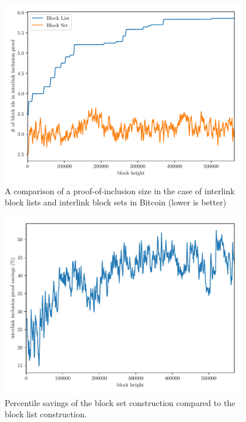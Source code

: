 \begin{figure}[h]
\begin{center}
  \includegraphics[width=0.95\textwidth]{figures/interlink-proof-list-vs-set.pdf}
  \caption{A comparison of a proof-of-inclusion size in the case of interlink block lists and interlink block sets in Bitcoin (lower is better)}
  \label{fig.set-list-proof-comparison}
  \end{center}
\end{figure}

\begin{figure}[h]
\begin{center}
  \includegraphics[width=0.95\textwidth]{figures/interlink-proof-savings-from-blockset.pdf}
  \caption{Percentile savings of the block set construction compared to the
           block list construction.}
  \label{fig.set-list-proof-comparison-savings}
  \end{center}
\end{figure}

